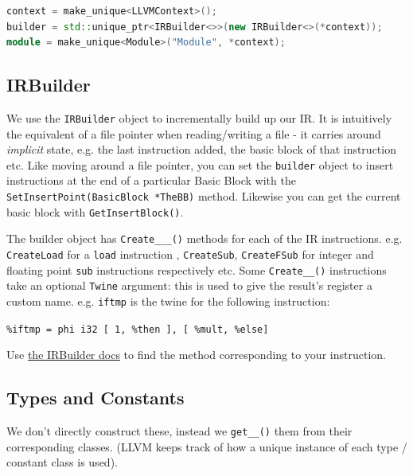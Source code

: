 \begin{lstlisting}[language=C++,caption={ir\_codegen\_visitor.cc}]
context = make_unique<LLVMContext>();
builder = std::unique_ptr<IRBuilder<>>(new IRBuilder<>(*context));
module = make_unique<Module>("Module", *context);
\end{lstlisting}

\hypertarget{irbuilder}{%
\subsection{\texorpdfstring{\protect\hyperlink{irbuilder}{}IRBuilder}{IRBuilder}}\label{irbuilder}}

We use the \texttt{IRBuilder} object to incrementally build up our IR.
It is intuitively the equivalent of a file pointer when reading/writing
a file - it carries around \emph{implicit} state, e.g. the last
instruction added, the basic block of that instruction etc. Like moving
around a file pointer, you can set the \texttt{builder} object to insert
instructions at the end of a particular Basic Block with the
\texttt{SetInsertPoint(BasicBlock\ *TheBB)} method. Likewise you can get
the current basic block with \texttt{GetInsertBlock()}.

The builder object has \texttt{Create\_\_\_()} methods for each of the
IR instructions. e.g. \texttt{CreateLoad} for a \texttt{load}
instruction , \texttt{CreateSub}, \texttt{CreateFSub} for integer and
floating point \texttt{sub} instructions respectively etc. Some
\texttt{Create\_\_()} instructions take an optional \texttt{Twine}
argument: this is used to give the result's register a custom name. e.g.
\texttt{iftmp} is the twine for the following instruction:

\texttt{\%iftmp\ =\ phi\ i32\ {[}\ 1,\ \%then\ {]},\ {[}\ \%mult,\ \%else{]}}

Use \href{https://llvm.org/doxygen/classllvm_1_1IRBuilderBase.html}{the
IRBuilder docs} to find the method corresponding to your instruction.

\hypertarget{types-and-constants}{%
\subsection{\texorpdfstring{\protect\hyperlink{types-and-constants}{}Types
and Constants}{Types and Constants}}\label{types-and-constants}}

We don't directly construct these, instead we \texttt{get\_\_()} them
from their corresponding classes. (LLVM keeps track of how a unique
instance of each type / constant class is used).

